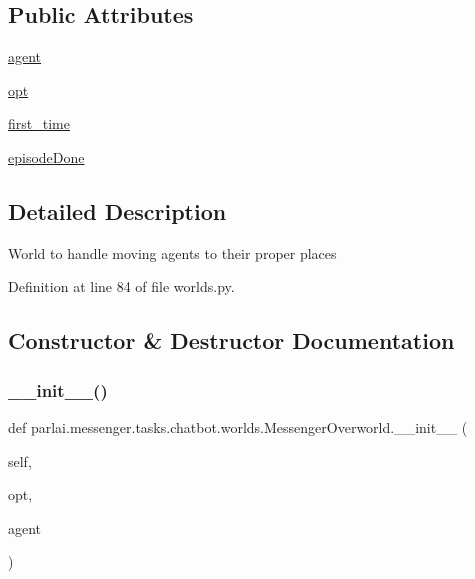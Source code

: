 \subsection*{Public Attributes}
\begin{DoxyCompactItemize}
\item 
\hyperlink{classparlai_1_1messenger_1_1tasks_1_1chatbot_1_1worlds_1_1MessengerOverworld_ac04cf729ce144a4b861cea71bc3538fc}{agent}
\item 
\hyperlink{classparlai_1_1messenger_1_1tasks_1_1chatbot_1_1worlds_1_1MessengerOverworld_ab36fce9d2786910417356427e8716cb3}{opt}
\item 
\hyperlink{classparlai_1_1messenger_1_1tasks_1_1chatbot_1_1worlds_1_1MessengerOverworld_a4fc6debbb7611ff43bd85ca6bf8ff5f6}{first\+\_\+time}
\item 
\hyperlink{classparlai_1_1messenger_1_1tasks_1_1chatbot_1_1worlds_1_1MessengerOverworld_a10a8c544489bcc9d17a1fe00f845276d}{episode\+Done}
\end{DoxyCompactItemize}


\subsection{Detailed Description}
\begin{DoxyVerb}World to handle moving agents to their proper places\end{DoxyVerb}
 

Definition at line 84 of file worlds.\+py.



\subsection{Constructor \& Destructor Documentation}
\mbox{\label{classparlai_1_1messenger_1_1tasks_1_1chatbot_1_1worlds_1_1MessengerOverworld_acb3b294ccb0625533852cab9aa3a18f4}} 
\subsubsection{\texorpdfstring{\+\_\+\+\_\+init\+\_\+\+\_\+()}{\_\_init\_\_()}}
{\footnotesize\ttfamily def parlai.\+messenger.\+tasks.\+chatbot.\+worlds.\+Messenger\+Overworld.\+\_\+\+\_\+init\+\_\+\+\_\+ (\begin{DoxyParamCaption}\item[{}]{self,  }\item[{}]{opt,  }\item[{}]{agent }\end{DoxyParamCaption})}




